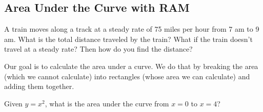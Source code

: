 \subsection*{Area Under the Curve with RAM}
A train moves along a track at a steady rate of 75 miles per hour from 7 am to 9 am. What is the total distance traveled by the train? What if the train doesn't travel at a steady rate? Then how do you find the distance?

Our goal is to calculate the area under a curve. We do that by breaking the area (which we cannot calculate) into rectangles (whose area we can calculate) and adding them together.

\begin{questions}
    
    \question Given $y=x^2$, what is the area under the curve from $x=0$ to $x=4$?
    

\end{questions}
